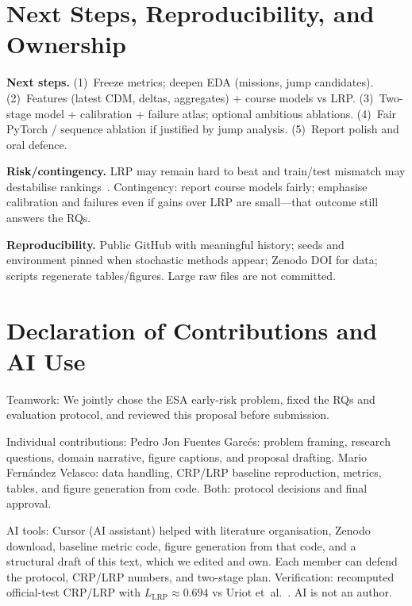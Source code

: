 \documentclass[clean]{bam-proposal}
\begin{document}
\section{Next Steps, Reproducibility, and Ownership}

\textbf{Next steps.}
(1)~Freeze metrics; deepen EDA (missions, jump candidates).
(2)~Features (latest CDM, deltas, aggregates) + course models vs LRP.
(3)~Two-stage model + calibration + failure atlas; optional ambitious ablations.
(4)~Fair PyTorch / sequence ablation if justified by jump analysis.
(5)~Report polish and oral defence.

\textbf{Risk/contingency.}
LRP may remain hard to beat and train/test mismatch may destabilise rankings~\citep{uriot2021collision}. Contingency: report course models fairly; emphasise calibration and failures even if gains over LRP are small---that outcome still answers the RQs.

\textbf{Reproducibility.}
Public GitHub with meaningful history; seeds and environment pinned when stochastic methods appear; Zenodo DOI for data; scripts regenerate tables/figures. Large raw files are not committed.

\section*{Declaration of Contributions and AI Use}

Teamwork: We jointly chose the ESA early-risk problem, fixed the RQs and evaluation protocol, and reviewed this proposal before submission.

Individual contributions:
Pedro Jon Fuentes Garc\'es: problem framing, research questions, domain narrative, figure captions, and proposal drafting.
Mario Fern\'andez Velasco: data handling, CRP/LRP baseline reproduction, metrics, tables, and figure generation from code.
Both: protocol decisions and final approval.

AI tools: Cursor (AI assistant) helped with literature organisation, Zenodo download, baseline metric code, figure generation from that code, and a structural draft of this text, which we edited and own. Each member can defend the protocol, CRP/LRP numbers, and two-stage plan. Verification: recomputed official-test CRP/LRP with \(L_{\mathrm{LRP}}\approx 0.694\) vs Uriot et~al.~\citep{uriot2021collision}. AI is not an author.

\BAMprintbibliography
\end{document}
